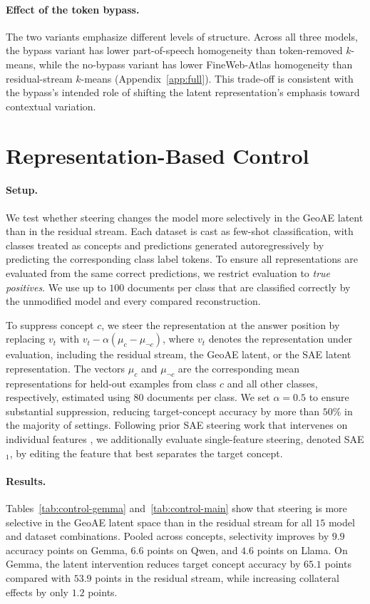 \documentclass[11pt]{article}
\begin{document}
\paragraph{Effect of the token bypass.}
The two variants emphasize different levels of structure.
Across all three models, the bypass variant has lower part-of-speech homogeneity than token-removed $k$-means, while the no-bypass variant has lower FineWeb-Atlas homogeneity than residual-stream $k$-means (Appendix~\ref{app:full}).
This trade-off is consistent with the bypass's intended role of shifting the latent representation's emphasis toward contextual variation.

\section{Representation-Based Control}
\label{sec:control}

\paragraph{Setup.}
We test whether steering changes the model more selectively in the GeoAE latent than in the residual stream. Each dataset is cast as few-shot classification, with classes treated as concepts and predictions generated autoregressively by predicting the corresponding class label tokens. To ensure all representations are evaluated from the same correct predictions, we restrict evaluation to \emph{true positives}. We use up to $100$ documents per class that are classified correctly by the unmodified model and every compared reconstruction.

To suppress concept $c$, we steer the representation at the answer position by replacing $v_t$ with $v_t-\alpha(\mu_c-\mu_{\neg c})$, where $v_t$ denotes the representation under evaluation, including the residual stream, the GeoAE latent, or the SAE latent representation. The vectors $\mu_c$ and $\mu_{\neg c}$ are the corresponding mean representations for held-out examples from class $c$ and all other classes, respectively, estimated using $80$ documents per class. We set $\alpha=0.5$ to ensure substantial suppression, reducing target-concept accuracy by more than $50\%$ in the majority of settings. Following prior SAE steering work that intervenes on individual features \citep{templeton2024scaling,arad2025saes}, we additionally evaluate single-feature steering, denoted SAE$_1$, by editing the feature that best separates the target concept.

\paragraph{Results.}
Tables~\ref{tab:control-gemma} and~\ref{tab:control-main} show that steering is more selective in the GeoAE latent space than in the residual stream for all $15$ model and dataset combinations. Pooled across concepts, selectivity improves by $9.9$ accuracy points on Gemma, $6.6$ points on Qwen, and $4.6$ points on Llama. On Gemma, the latent intervention reduces target concept accuracy by $65.1$ points compared with $53.9$ points in the residual stream, while increasing collateral effects by only $1.2$ points.
\end{document}
